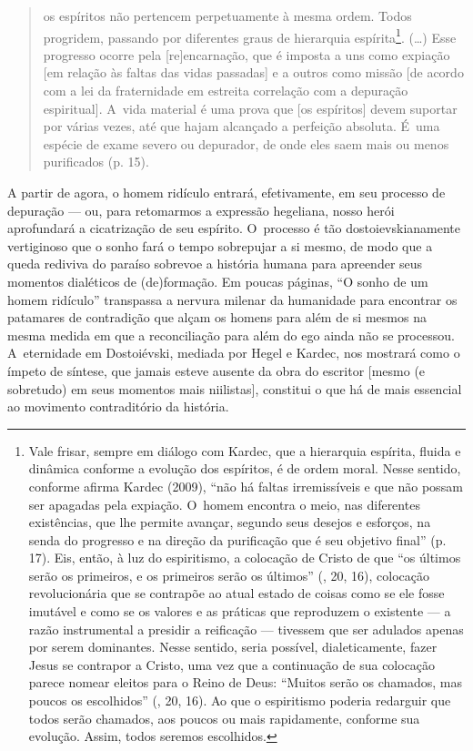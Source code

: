 \begin{quote}
os espíritos não pertencem perpetuamente à mesma ordem. Todos progridem,
passando por diferentes graus de hierarquia espírita\footnote{Vale
  frisar, sempre em diálogo com Kardec, que a hierarquia espírita,
  fluida e dinâmica conforme a evolução dos espíritos, é de ordem moral.
  Nesse sentido, conforme afirma Kardec (2009), ``não há faltas
  irremissíveis e que não possam ser apagadas pela expiação. O~homem
  encontra o meio, nas diferentes existências, que lhe permite avançar,
  segundo seus desejos e esforços, na senda do progresso e na direção da
  purificação que é seu objetivo final'' (p. 17). Eis, então, à luz do
  espiritismo, a colocação de Cristo de que ``os últimos serão os
  primeiros, e os primeiros serão os últimos'' (, 20, 16),
  colocação revolucionária que se contrapõe ao atual estado de coisas
  como se ele fosse imutável e como se os valores e as práticas que
  reproduzem o existente --- a razão instrumental a presidir a reificação
  --- tivessem que ser adulados apenas por serem dominantes. Nesse
  sentido, seria possível, dialeticamente, fazer Jesus se contrapor a
  Cristo, uma vez que a continuação de sua colocação parece nomear
  eleitos para o Reino de Deus: ``Muitos serão os chamados, mas poucos
  os escolhidos'' (, 20, 16). Ao que o espiritismo poderia
  redarguir que todos serão chamados, aos poucos ou mais rapidamente,
  conforme sua evolução. Assim, todos seremos escolhidos.}. (\ldots) Esse
progresso ocorre pela {[}re{]}encarnação, que é imposta a uns como
expiação {[}em relação às faltas das vidas passadas{]} e a outros como
missão {[}de acordo com a lei da fraternidade em estreita correlação com
a depuração espiritual{]}. A~vida material é uma prova que {[}os
espíritos{]} devem suportar por várias vezes, até que hajam alcançado a
perfeição absoluta. É~uma espécie de exame severo ou depurador, de onde
eles saem mais ou menos purificados (p. 15).
\end{quote}

A partir de agora, o homem ridículo entrará, efetivamente, em seu
processo de depuração --- ou, para retomarmos a expressão hegeliana,
nosso herói aprofundará a cicatrização de seu espírito. O~processo é tão
dostoievskianamente vertiginoso que o sonho fará o tempo sobrepujar a si
mesmo, de modo que a queda rediviva do paraíso sobrevoe a história
humana para apreender seus momentos dialéticos de (de)formação. Em
poucas páginas, ``O sonho de um homem ridículo'' transpassa a nervura
milenar da humanidade para encontrar os patamares de contradição que
alçam os homens para além de si mesmos na mesma medida em que a
reconciliação para além do ego ainda não se processou. A~eternidade em
Dostoiévski, mediada por Hegel e Kardec, nos mostrará como o ímpeto de
síntese, que jamais esteve ausente da obra do escritor {[}mesmo (e
sobretudo) em seus momentos mais niilistas{]}, constitui o que há de
mais essencial ao movimento contraditório da história.

